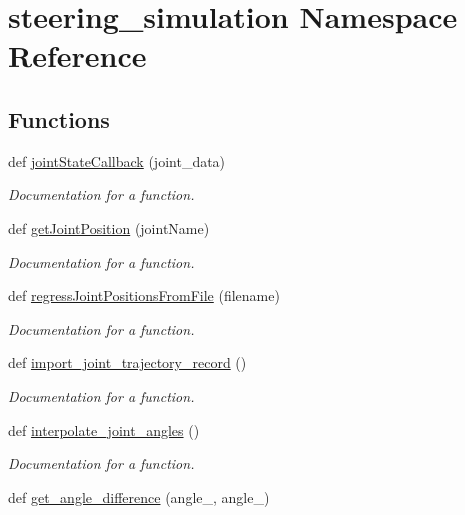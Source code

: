 \hypertarget{namespacesteering__simulation}{}\section{steering\+\_\+simulation Namespace Reference}
\label{namespacesteering__simulation}
\subsection*{Functions}
\begin{DoxyCompactItemize}
\item 
def \mbox{\hyperlink{namespacesteering__simulation_a49d8e64bcd7d1221d6de01b9b22bb799}{joint\+State\+Callback}} (joint\+\_\+data)
\begin{DoxyCompactList}\small\item\em Documentation for a function. \end{DoxyCompactList}\item 
def \mbox{\hyperlink{namespacesteering__simulation_a058dbff61afc8af058769267605ffc5a}{get\+Joint\+Position}} (joint\+Name)
\begin{DoxyCompactList}\small\item\em Documentation for a function. \end{DoxyCompactList}\item 
def \mbox{\hyperlink{namespacesteering__simulation_a3bdf7d63620ec8e0a63d41324b1cdaa4}{regress\+Joint\+Positions\+From\+File}} (filename)
\begin{DoxyCompactList}\small\item\em Documentation for a function. \end{DoxyCompactList}\item 
def \mbox{\hyperlink{namespacesteering__simulation_a628f6027d970db8d4071e5846de522fc}{import\+\_\+joint\+\_\+trajectory\+\_\+record}} ()
\begin{DoxyCompactList}\small\item\em Documentation for a function. \end{DoxyCompactList}\item 
def \mbox{\hyperlink{namespacesteering__simulation_a6e3b1fe25edfbec1713a6bd3ef2a445e}{interpolate\+\_\+joint\+\_\+angles}} ()
\begin{DoxyCompactList}\small\item\em Documentation for a function. \end{DoxyCompactList}\item 
def \mbox{\hyperlink{namespacesteering__simulation_a920f69692c79162b2296b1a220bba527}{get\+\_\+angle\+\_\+difference}} (angle\+\_, angle\+\_)

\end{DoxyCompactItemize}
